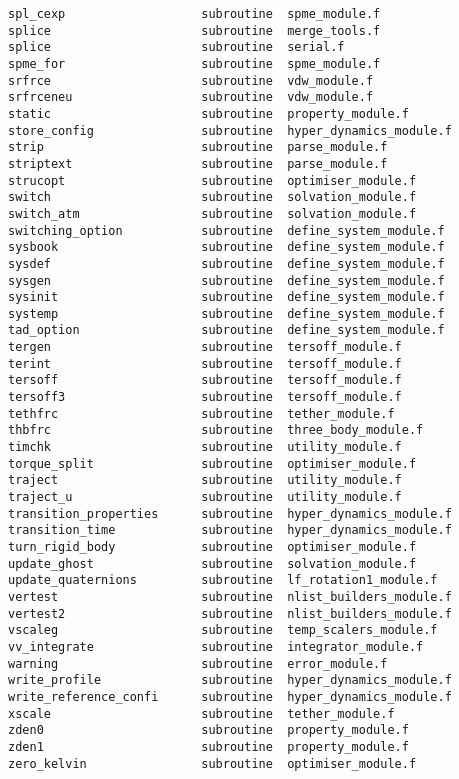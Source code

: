 \begin{verbatim}
spl_cexp                   subroutine  spme_module.f             
splice                     subroutine  merge_tools.f             
splice                     subroutine  serial.f                  
spme_for                   subroutine  spme_module.f             
srfrce                     subroutine  vdw_module.f              
srfrceneu                  subroutine  vdw_module.f              
static                     subroutine  property_module.f         
store_config               subroutine  hyper_dynamics_module.f   
strip                      subroutine  parse_module.f            
striptext                  subroutine  parse_module.f            
strucopt                   subroutine  optimiser_module.f        
switch                     subroutine  solvation_module.f        
switch_atm                 subroutine  solvation_module.f        
switching_option           subroutine  define_system_module.f    
sysbook                    subroutine  define_system_module.f    
sysdef                     subroutine  define_system_module.f    
sysgen                     subroutine  define_system_module.f    
sysinit                    subroutine  define_system_module.f    
systemp                    subroutine  define_system_module.f    
tad_option                 subroutine  define_system_module.f    
tergen                     subroutine  tersoff_module.f          
terint                     subroutine  tersoff_module.f          
tersoff                    subroutine  tersoff_module.f          
tersoff3                   subroutine  tersoff_module.f          
tethfrc                    subroutine  tether_module.f           
thbfrc                     subroutine  three_body_module.f       
timchk                     subroutine  utility_module.f          
torque_split               subroutine  optimiser_module.f        
traject                    subroutine  utility_module.f          
traject_u                  subroutine  utility_module.f          
transition_properties      subroutine  hyper_dynamics_module.f   
transition_time            subroutine  hyper_dynamics_module.f   
turn_rigid_body            subroutine  optimiser_module.f        
update_ghost               subroutine  solvation_module.f        
update_quaternions         subroutine  lf_rotation1_module.f     
vertest                    subroutine  nlist_builders_module.f   
vertest2                   subroutine  nlist_builders_module.f   
vscaleg                    subroutine  temp_scalers_module.f     
vv_integrate               subroutine  integrator_module.f       
warning                    subroutine  error_module.f            
write_profile              subroutine  hyper_dynamics_module.f   
write_reference_confi      subroutine  hyper_dynamics_module.f   
xscale                     subroutine  tether_module.f           
zden0                      subroutine  property_module.f         
zden1                      subroutine  property_module.f         
zero_kelvin                subroutine  optimiser_module.f        
\end{verbatim}
